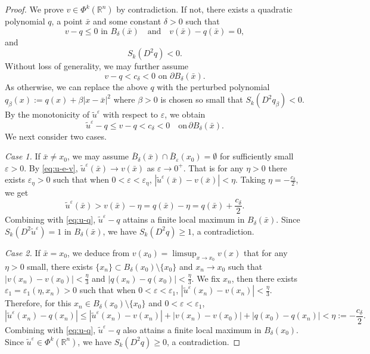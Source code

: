 \documentclass[10pt,a4paper]{amsart}
\begin{document}
\begin{proof}
	We prove $v\in\Phi^k(\mathbb{R}^n)$ by contradiction. If not, there exists a quadratic polynomial $q$, a point $\bar{x}$ and some constant $\delta>0$ such that
	\[v-q\leq0 \text{ in }B_\delta(\bar{x})\quad\text{and}\quad v(\bar{x})-q(\bar{x})=0,\]
	and
	\[S_k(D^2q)<0.\]
	Without loss of generality, we may further assume
	\[
	v - q < c_\delta < 0 \text{ on } \partial B_\delta(\bar{x}). 
	\]
	As otherwise, we can replace the above $q$ with the perturbed polynomial \(q_\beta(x):= q(x) + \beta|x - \bar{x}|^2\) where \(\beta > 0\) is chosen so small that \(S_k(D^2q_\beta) < 0\). By the monotonicity of $\tilde{u}^\varepsilon$ with respect to $\varepsilon$, we obtain 
	\begin{equation}\label{eq:u-q}
		\tilde{u}^\varepsilon - q \leq v - q < c_\delta < 0 \quad \text{on} \, \partial B_\delta(\bar{x}).
	\end{equation} 
	We next consider two cases.

	\textit{Case 1.} If $\bar{x}\neq x_0$, we may assume \(\bar{B}_\delta(\bar{x})\cap\bar{B}_\varepsilon(x_0)=\emptyset\) for sufficiently small \(\varepsilon > 0\). 
	By \eqref{eq:u-e-v}, \(\tilde{u}^\varepsilon(\bar{x}) \to v(\bar{x})\) as $\varepsilon\to 0^+$. That is for any \(\eta > 0\) there exists \(\varepsilon_\eta > 0\) such that when \(0<\varepsilon < \varepsilon_\eta\), \(|\tilde{u}^\varepsilon(\bar{x}) - v(\bar{x})| < \eta\). Taking $\eta=-\frac{c_\delta}{2}$, we get
	\begin{equation*}
		\tilde{u}^{\varepsilon}(\bar{x})>v(\bar{x})-\eta=q(\bar{x})-\eta=q(\bar{x})+\frac{c_\delta}{2}.
	\end{equation*}
	Combining with \eqref{eq:u-q}, \(\tilde{u}^\varepsilon - q\) attains  a finite local maximum in \(B_\delta(\bar{x})\). Since \(S_k(D^2\tilde{u}^\varepsilon) = 1\) in \(B_\delta(\bar{x})\), we have \(S_k(D^2q) \geq 1\), a contradiction.

	\textit{Case 2.} If $\bar{x}=x_0$, we deduce from \( v(x_0) = \limsup_{x \to x_0} v(x) \)   that for any \( \eta > 0 \) small, there exists \(\{x_n\} \subset B_\delta(x_0) \setminus \{x_0\}\) and \( x_n \to x_0 \) such that \(|v(x_n) - v(x_0)| < \frac{\eta}{3}\) and \(|q(x_n)-q(x_0)|<\frac{\eta}{3}\). We fix \( x_n \), then there exists \( \varepsilon_1 = \varepsilon_1(\eta, x_n) > 0 \) such that when \( 0<\varepsilon < \varepsilon_1 \), \( |\tilde{u}^\varepsilon(x_n) - v(x_n)| < \frac{\eta}{3} \). Therefore, for this \( x_n \in B_\delta(x_0)\setminus\{x_0\} \) and $0<\varepsilon<\varepsilon_1$,
	\[
	|\tilde{u}^\varepsilon(x_n) - q(x_n)| \leq |\tilde{u}^\varepsilon(x_n) - v(x_n)| + |v(x_n) - v(x_0)| + |q(x_0) - q(x_n)| < \eta:=-\frac{c_\delta}{2}.
	\]
	Combining with \eqref{eq:u-q}, \( \tilde{u}^\varepsilon - q \) also attains a finite local maximum in \( B_\delta(x_0) \). Since $\tilde{u}^\varepsilon\in\Phi^k(\mathbb{R}^n)$, we have \( S_k(D^2q) \geq 0 \), a contradiction. 
\end{proof}
\end{document}
